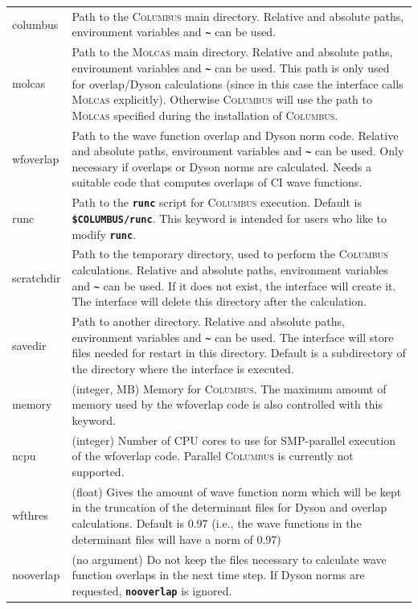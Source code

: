 \documentclass[a4paper,10pt,DIV=15,openany,twoside=false]{scrbook}
\newcommand{\ttt}[1]{\textbf{\texttt{#1}}}
\begin{document}
\begin{longtable}{>{\ttfamily}lp{12cm}}
columbus        &Path to the \textsc{Columbus} main directory. Relative and absolute paths, environment variables and \ttt{\textasciitilde} can be used.\\
molcas          &Path to the \textsc{Molcas} main directory.  Relative and absolute paths, environment variables and \ttt{\textasciitilde} can be used. This path is only used for overlap/Dyson calculations (since in this case the interface calls \textsc{Molcas} explicitly). Otherwise \textsc{Columbus} will use the path to \textsc{Molcas} specified during the installation of \textsc{Columbus}.\\
wfoverlap       &Path to the wave function overlap and Dyson norm code. Relative and absolute paths, environment variables and \ttt{\textasciitilde} can be used. Only necessary if overlaps or Dyson norms are calculated. Needs a suitable code that computes overlaps of CI wave functions.\\
runc            &Path to the \ttt{runc} script for \textsc{Columbus} execution. Default is \ttt{\$COLUMBUS/runc}. This keyword is intended for users who like to modify \ttt{runc}.\\
scratchdir      &Path to the temporary directory, used to perform the \textsc{Columbus} calculations. Relative and absolute paths, environment variables and \ttt{\textasciitilde} can be used. If it does not exist, the interface will create it. The interface will delete this directory after the calculation.\\
savedir         &Path to another directory.  Relative and absolute paths, environment variables and \ttt{\textasciitilde} can be used. The interface will store files needed for restart in this directory. Default is a subdirectory of the directory where the interface is executed.\\
memory          &(integer, MB) Memory for \textsc{Columbus}. The maximum amount of memory used by the wfoverlap code is also controlled with this keyword.\\
ncpu            &(integer) Number of CPU cores to use for SMP-parallel execution of the wfoverlap code. Parallel \textsc{Columbus} is currently not supported.\\
wfthres         &(float) Gives the amount of wave function norm which will be kept in the truncation of the determinant files for Dyson and overlap calculations. Default is 0.97 (i.e., the wave functions in the determinant files will have a norm of 0.97)\\
nooverlap       &(no argument) Do not keep the files necessary to calculate wave function overlaps in the next time step. If Dyson norms are requested, \ttt{nooverlap} is ignored.\\

\end{longtable}
\end{document}
